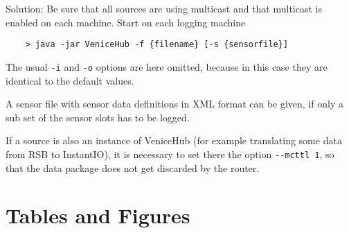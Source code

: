 \documentclass[german,a4paper]{article}
\begin{document}
Solution: Be sure that all sources are using multicast and that multicast is enabled on each machine.  Start on each logging machine
\begin{lstlisting}
    > java -jar VeniceHub -f {filename} [-s {sensorfile}]
\end{lstlisting}
The usual \texttt{-i} and \texttt{-o} options are here omitted, because in this case they are identical to the default values.

A sensor file with sensor data definitions in XML format can be given, if only a sub set of the sensor slots has to be logged.

If a source is also an instance of VeniceHub (for example translating some data from RSB to InstantIO), it is necessary to set there the option \texttt{-\--mcttl 1}, so that the data package does not get discarded by the router.

\newpage

\section{Tables and Figures}

\listoftables{}

\listoffigures{}
\end{document}
